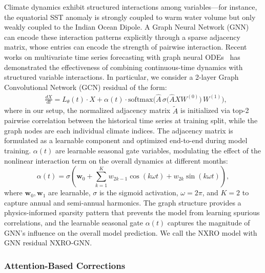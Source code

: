 Climate dynamics exhibit structured interactions among variables---for instance, the equatorial SST anomaly is strongly coupled to warm water volume but only weakly coupled to the Indian Ocean Dipole. A Graph Neural Network (GNN) ~\cite{kipf2017gcn,wu2020comprehensive} can encode these interaction patterns explicitly through a sparse adjacency matrix, whose entries can encode the strength of pairwise interaction. Recent works on multivariate time series forecasting with graph neural ODEs~\cite{huang2023generalizinggraphodelearning} has demonstrated the effectiveness of combining continuous-time dynamics with structured variable interactions. In particular, we consider a 2-layer Graph Convolutional Network (GCN) residual of the form: %
\begin{align}\label{eq:nxro_graph}
    & \frac{dX}{dt} = L_\theta(t) \cdot X + \alpha(t) \cdot \mathrm{softmax}\!\Big(\hat{A}\,\sigma\!\big(\hat{A}XW^{(0)}\big)\,W^{(1)}\Big), %
\end{align}
where in our setup, the normalized adjacency matrix $\tilde{A}$ is initialized via top-2 pairwise correlation between the historical time series at training split, while the graph nodes are each individual climate indices. The adjacency matrix is formulated as a learnable component and optimized end-to-end during model training. $\alpha(t)$ are learnable seasonal gate variables, modulating the effect of the nonlinear interaction term on the overall dynamics at different months:
\begin{equation}\label{eq:gate}
    \alpha(t) = \sigma \left( \mathbf{w}_0 + \sum_{k=1}^{K}w_{2k-1}\cos(k\omega t)+w_{2k}\sin(k\omega t) \right),
\end{equation}
where $\mathbf{w}_0,\mathbf{w}_1$ are learnable, $\sigma$ is the sigmoid activation, $\omega = 2\pi$, and $K = 2$ to capture annual and semi-annual harmonics. The graph structure provides a physics-informed sparsity pattern that prevents the model from learning spurious correlations, and the learnable seasonal gate $\alpha(t)$ captures the magnitude of GNN's influence on the overall model prediction. We call the NXRO model with GNN residual NXRO-GNN.

\subsubsection{Attention-Based Corrections}

